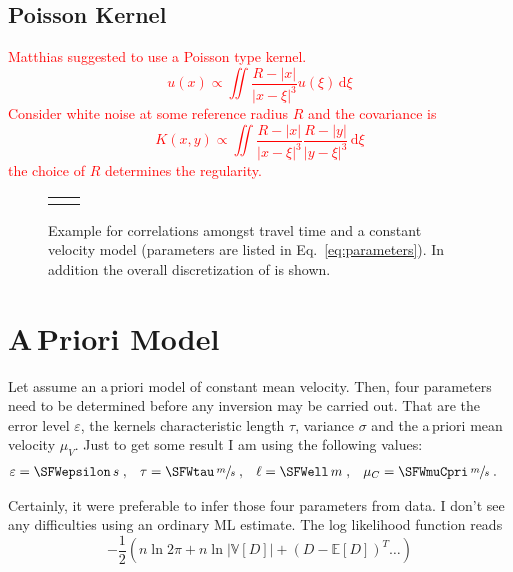 \documentclass[11pt]{article}
\newcommand\worries[1]{\textcolor{red}{#1}}
\newcommand\Mean[1]{\mathbb{E}\!\left[#1\right]}
\newcommand\Var[1]{\mathbb{V}\!\left[#1\right]}
\begin{document}
\subsection{Poisson Kernel}
\worries{Matthias suggested to use a Poisson type kernel.
\begin{equation}
    u(x) \propto \iint \frac{R-|x|}{|x-\xi|^3} u(\xi) \, \mathrm d \xi
\end{equation}
Consider white noise at some reference radius $R$ and the covariance is
\begin{equation}
    K(x,y) \propto \iint \frac{R-|x|}{|x-\xi|^3} \frac{R-|y|}{|y-\xi|^3} \, \mathrm d \xi
\end{equation}
the choice of $R$ determines the regularity. }

\begin{figure}
    \centering
    \begin{tabular}{p{}p{}}
    \vspace{0pt}  &
    \vspace{0pt} 
    \end{tabular}
    \caption{Example for correlations amongst travel time and a constant velocity model (parameters are listed in Eq.~\ref{eq:parameters}).
        In addition the overall discretization of is shown. }
    \label{fig:correlation}
\end{figure}


\section{A\,Priori Model}

Let assume an a\,priori model of constant mean velocity.
Then, four parameters need to be determined before any inversion may be carried out.
That are the error level $\varepsilon$, the kernels characteristic length $\tau$, variance $\sigma$ and the a\,priori mean velocity $\mu_V$.
Just to get some result I am using the following values:
\begin{align}\label{eq:parameters}
    \varepsilon &= \SFWepsilon \, s \;,&
    \tau &= \SFWtau \, \sfrac ms \;,&
    \ell &= \SFWell \, m \;,&
    \mu_C &= \SFWmuCpri \, \sfrac ms \;.
\end{align}

Certainly, it were preferable to infer those four parameters from data.
I don't see any difficulties using an ordinary ML estimate.
The log likelihood function reads
\begin{equation}
    -\frac 12 \left( n \ln 2\pi + n \ln |\Var D| + (D - \Mean D)^T \dots  \right)
\end{equation}
\end{document}
